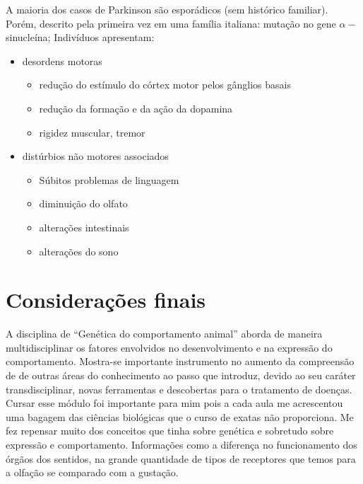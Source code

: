 \documentclass[
	article,			%
	12pt,				%
	oneside,			%
	a4paper,			%
	english,			%
	brazil,				%
	sumario=tradicional
	]{abntex2}
\begin{document}
A maioria dos casos de Parkinson são esporádicos (sem histórico familiar). Porém, descrito	pela primeira vez em uma	família	italiana:	mutação	no gene $\alpha-$sinucleína;
Indivíduos apresentam:
\begin{itemize}

    \item desordens motoras
    	\begin{itemize}
			\item  redução do estímulo	do córtex	motor	pelos gânglios basais
			\item  redução da formação e da ação da dopamina
			\item  rigidez	muscular,	tremor
    	\end{itemize}
    
    \item distúrbios não motores associados
        \begin{itemize}
			\item Súbitos	problemas	de	linguagem
            \item diminuição do olfato
            \item alterações intestinais
            \item alterações do sono
		\end{itemize}
    
\end{itemize}

% 
\section*{Considerações finais}

A disciplina de ``Genética do comportamento animal'' aborda de maneira multidisciplinar os fatores envolvidos no desenvolvimento e na expressão do comportamento. Mostra-se importante instrumento no aumento da compreensão de de outras áreas do conhecimento ao passo que introduz, devido ao seu caráter transdisciplinar,  novas ferramentas e descobertas para o tratamento de doenças. Cursar esse módulo foi importante para mim pois a cada aula me acrescentou uma bagagem das ciências biológicas que o curso de exatas não proporciona. Me fez repensar muito dos conceitos que tinha sobre genética e sobretudo sobre expressão e comportamento. Informações como a diferença no funcionamento dos órgãos dos sentidos, na grande quantidade de tipos de receptores que temos para a olfação se comparado com a gustação.
\end{document}
